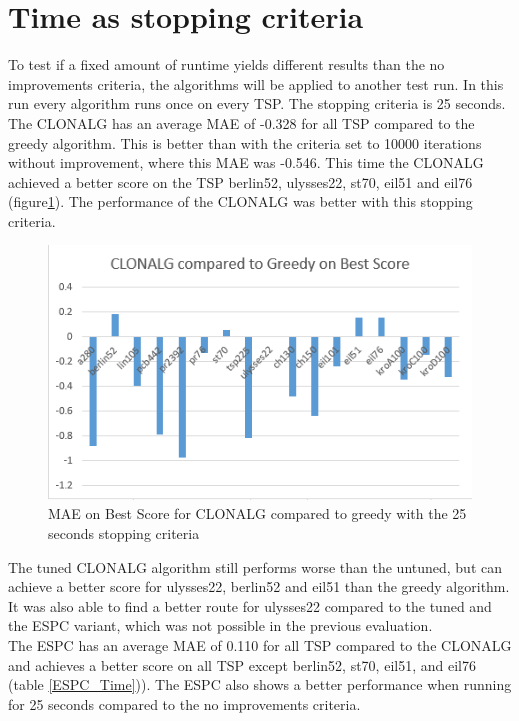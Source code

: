 \section{Time as stopping criteria}
To test if a fixed amount of runtime yields different results than the no improvements criteria, the algorithms will be applied to another test run. In this run every algorithm runs once on every TSP. The stopping criteria is 25 seconds.\\
The CLONALG has an average MAE of -0.328 for all TSP compared to the greedy algorithm. This is better than with the criteria set to 10000 iterations without improvement, where this MAE was -0.546. This time the CLONALG achieved a better score on the TSP berlin52, ulysses22, st70, eil51 and eil76 (figure\ref{CLONALG_Time}). The performance of the CLONALG was better with this stopping criteria.
\begin{figure}[H]
	\includegraphics[]{Images/CLONALG_Time.png}
	\caption{MAE on Best Score for CLONALG compared to greedy with the 25 seconds stopping criteria}
	\label{CLONALG_Time}
\end{figure}
The tuned CLONALG algorithm still performs worse than the untuned, but can achieve a better score for ulysses22, berlin52 and eil51 than the greedy algorithm. It was also able to find a better route for ulysses22 compared to the tuned and the ESPC variant, which was not possible in the previous evaluation.\\
The ESPC has an average MAE of 0.110 for all TSP compared to the CLONALG and achieves a better score on all TSP except berlin52, st70, eil51, and eil76 (table \ref{ESPC_Time})). The ESPC also shows a better performance when running for 25 seconds compared to the no improvements criteria.
